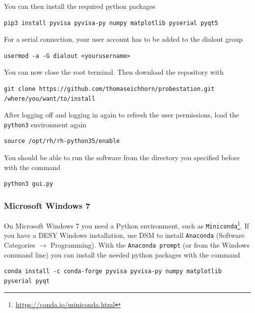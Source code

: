 \documentclass[a4paper]{article}
\begin{document}
You can then install the required python packages

\medskip
\begin{lstlisting}
pip3 install pyvisa pyvisa-py numpy matplotlib pyserial pyqt5
\end{lstlisting}
\medskip

For a serial connection, your user account has to be added to the dialout group

\medskip
\begin{lstlisting}
usermod -a -G dialout <yourusername>
\end{lstlisting}
\medskip

You can now close the root terminal.
Then download the repository with

\medskip
\begin{lstlisting}
git clone https://github.com/thomaseichhorn/probestation.git /where/you/want/to/install
\end{lstlisting}
\medskip

After logging off and logging in again to refresh the user permissions, load the {\tt python3} environment again

\medskip
\begin{lstlisting}
source /opt/rh/rh-python35/enable
\end{lstlisting}
\medskip

You should be able to run the software from the directory you specified before with the command

\medskip
\begin{lstlisting}
python3 gui.py
\end{lstlisting}
\medskip

\subsubsection{Microsoft Windows 7}

On Microsoft Windows 7 you need a Python environment, such as {\tt Miniconda}\footnote{\href{https://conda.io/miniconda.html}{https://conda.io/miniconda.html}}.
If you have a DESY Windows installation, use DSM to install {\tt Anaconda} (Software Categories $\rightarrow$ Programming).
With the {\tt Anaconda prompt} (or from the Windows command line) you can install the needed python packages with the command

\medskip
\begin{lstlisting}
conda install -c conda-forge pyvisa pyvisa-py numpy matplotlib pyserial pyqt
\end{lstlisting}
\medskip
\end{document}

